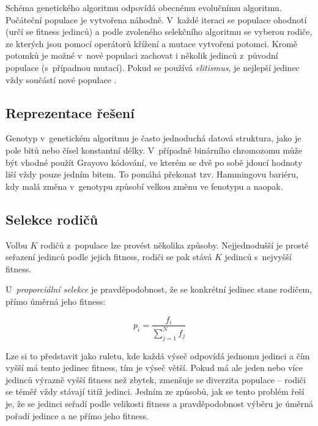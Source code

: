 
Schéma genetického algoritmu odpovídá obecnému evolučnímu algoritmu. Počáteční populace je vytvořena náhodně. V~každé iteraci se populace ohodnotí (určí se fitness jedinců) a podle zvoleného selekčního algoritmu se vyberou rodiče, ze kterých jsou pomocí operátorů křížení a mutace vytvořeni potomci. Kromě potomků je možné v~nové populaci zachovat i několik jedinců z~původní populace (s~případnou mutací). Pokud se používá \emph{elitismus}, je nejlepší jedinec vždy součástí nové populace \cite{HandbookEA} \cite{Modra}.


\subsection{Reprezentace řešení}

Genotyp v~genetickém algoritmu je často jednoduchá datová struktura, jako je pole bitů nebo čísel konstantní délky. V~případně binárního chromozomu může být vhodné použít Grayovo kódování, ve kterém se dvě po sobě jdoucí hodnoty liší vždy pouze jedním bitem. To pomáhá překonat tzv. Hammingovu bariéru, kdy malá změna v~genotypu způsobí velkou změnu ve fenotypu a naopak.


\subsection{Selekce rodičů}

Volbu $K$ rodičů z~populace lze provést několika způsoby. Nejjednodušší je prosté seřazení jedinců podle jejich fitness, rodiči se pak stává $K$ jedinců s~nejvyšší fitness.

U~\emph{proporciální selekce} je pravděpodobnost, že se konkrétní jedinec stane rodičem, přímo úměrná jeho fitness:

\begin{equation*}
p_i = \frac{f_i}{\sum_{j=1}^N{f_j}}
\end{equation*}

\noindent{}Lze si to představit jako ruletu, kde každá výseč odpovídá jednomu jedinci a čím vyšší má tento jedinec fitness, tím je výseč větší. Pokud má ale jeden nebo více jedinců výrazně vyšší fitness než zbytek, zmenšuje se diverzita populace -- rodiči se téměř vždy stávají titíž jedinci. Jedním ze způsobů, jak se tento problém řeší je, že se jedinci seřadí podle velikosti fitness a pravděpodobnost výběru je úměrná pořadí jedince a ne přímo jeho fitness.

